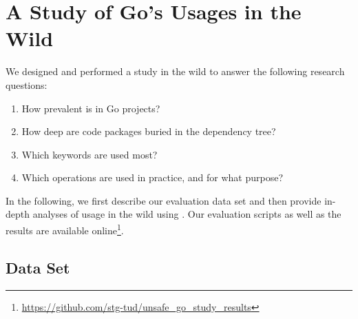 \section{A Study of Go's \unsafe{} Usages in the Wild}
\label{sec:eval}


We designed and performed a study in the wild to answer the following research questions:

\begin{enumerate}[leftmargin=*,label={RQ\arabic*}]
    \item How prevalent is \unsafe{} in Go projects? \label{rq:prevalApp}
    \item How deep are \unsafe{} code packages buried in the dependency tree? \label{rq:depsDepth}
    \item Which \unsafe{} keywords are used most? \label{rq:distTypes}
    \item Which \unsafe{} operations are used in practice, and for what purpose? \label{rq:purpose}
\end{enumerate}

%

In the following, we first describe our evaluation data set and then provide in-depth analyses of \unsafe{} usage in the wild using \toolUsage{}.
Our evaluation scripts as well as the results are available online\footnote{\url{https://github.com/stg-tud/unsafe_go_study_results}}.







\subsection{Data Set}

